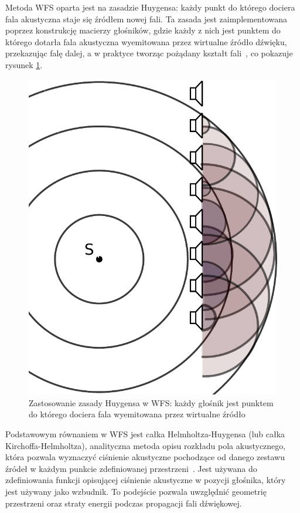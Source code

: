 \documentclass[12pt]{oska}
\begin{document}
Metoda WFS oparta jest na zasadzie Huygensa: każdy punkt
do którego dociera fala akustyczna staje się źródłem nowej fali. Ta zasada
jest zaimplementowana poprzez konstrukcję macierzy głośników, gdzie każdy z nich
jest punktem do którego dotarła fala akustyczna wyemitowana przez wirtualne
źródło dźwięku, przekazując falę dalej, a w praktyce tworząc pożądany kształt fali~\cite{hq_rendering}, co pokazuje rysunek
\ref{r:Huygens}.

\begin{figure}[!tbh]
  \centering
  \includegraphics[scale=.4]{vecgraphics/WFS_idea.pdf}
  \caption{Zastosowanie zasady Huygensa w WFS: każdy głośnik jest punktem do
    którego dociera fala wyemitowana przez wirtualne źródło}
  \label{r:Huygens}
\end{figure}

Podstawowym równaniem w WFS jest całka Helmholtza-Huygensa (lub całka
Kirchoffa-Helmholtza), analityczna metoda opisu rozkładu pola
akustycznego, która pozwala wyznaczyć ciśnienie akustyczne pochodzące od danego zestawu
źródeł w każdym punkcie zdefiniowanej przestrzeni~\cite{snaka}. Jest używana do
zdefiniowania funkcji opisującej ciśnienie akustyczne w pozycji głośnika, który
jest używany jako wzbudnik. To podejście pozwala uwzględnić geometrię
przestrzeni oraz straty energii podczas propagacji fali dźwiękowej.
\end{document}
